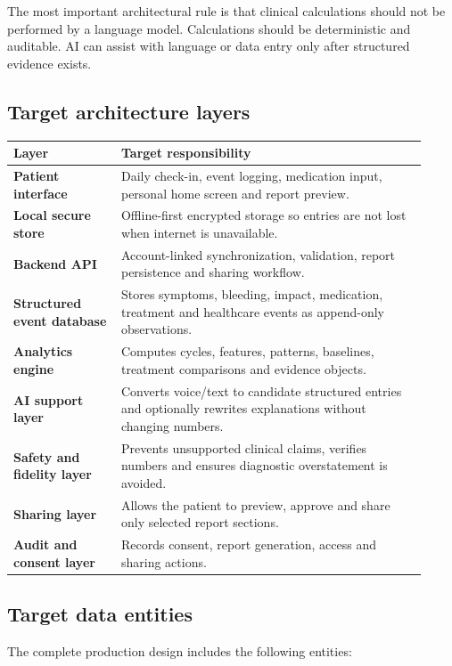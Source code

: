 \documentclass[11pt,a4paper]{article}
\begin{document}
The most important architectural rule is that clinical calculations should not be performed by a language model. Calculations should be deterministic and auditable. AI can assist with language or data entry only after structured evidence exists.

\subsection{Target architecture layers}

\begin{longtable}{>{\bfseries}p{0.24\linewidth}p{0.68\linewidth}}
\toprule
Layer & Target responsibility \\
\midrule
Patient interface & Daily check-in, event logging, medication input, personal home screen and report preview. \\
Local secure store & Offline-first encrypted storage so entries are not lost when internet is unavailable. \\
Backend API & Account-linked synchronization, validation, report persistence and sharing workflow. \\
Structured event database & Stores symptoms, bleeding, impact, medication, treatment and healthcare events as append-only observations. \\
Analytics engine & Computes cycles, features, patterns, baselines, treatment comparisons and evidence objects. \\
AI support layer & Converts voice/text to candidate structured entries and optionally rewrites explanations without changing numbers. \\
Safety and fidelity layer & Prevents unsupported clinical claims, verifies numbers and ensures diagnostic overstatement is avoided. \\
Sharing layer & Allows the patient to preview, approve and share only selected report sections. \\
Audit and consent layer & Records consent, report generation, access and sharing actions. \\
\bottomrule
\end{longtable}

\subsection{Target data entities}

The complete production design includes the following entities:
\end{document}
